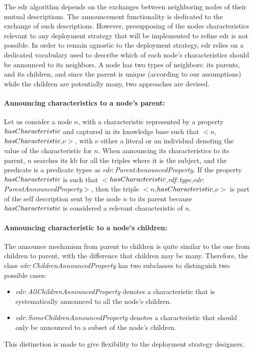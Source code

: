 \documentclass{iosart2c}
\newcommand{\namespace}[1]{\textit{#1$:$}}
\newcommand{\concept}[2]{\namespace{#1}\-\textit{#2}}
\newcommand{\triplet}[3]{$<$#1,\textit{#2},#3$>$}
\begin{document}
The \gls{edr} algorithm depends on the exchanges between neighboring nodes of their mutual descriptions.
The announcement functionality is dedicated to the exchange of such descriptions.
However, presupposing of the nodes characteristics relevant to any deployment strategy that will be implemented to refine \gls{edr} is not possible.
In order to remain agnostic to the deployment strategy, \gls{edr} relies on a dedicated vocabulary used to describe which of each node's characteristics should be announced to its neighbors. 
A node has two types of neighbors: its parents, and its children, and since the parent is unique (according to our assumptions) while the children are potentially many, two approaches are devised.

\paragraph{Announcing characteristics to a node's parent:}
Let us consider a node $n$, with a characteristic represented by a property $has\-Charac\-teris\-tic$ and captured in its knowledge base such that \triplet{$n$}{$has\-Charac\-teris\-tic$}{$\nu$}, with $\nu$ either a literal or an individual denoting the value of the characteristic for $n$.
When announcing its characteristics to its parent, $n$ searches its \gls{kb} for all the triples where it is the subject, and the predicate is a predicate types as \concept{edr}{Parent\-Announced\-Property}.
If the property $has\-Charac\-teris\-tic$ is such that \triplet{$has\-Charac\-teris\-tic$}{\concept{rdf}{type}}{\concept{edr}{Parent\-Announced\-Property}}, then the triple \triplet{$n$}{$has\-Charac\-teris\-tic$}{$\nu$} is part of the self description sent by the node $n$ to its parent because $has\-Charac\-teris\-tic$ is considered a relevant characteristic of $n$.

\paragraph{Announcing characteristic to a node's children:}
The announce mechanism from parent to children is quite similar to the one from children to parent, with the difference that children may be many.
Therefore, the class \concept{edr}{Children\-Announced\-Property} has two subclasses to distinguish two possible cases:
\begin{itemize}
	\item \concept{edr}{All\-Children\-Announced\-Property} denotes a characteristic that is systematically announced to all the node's children.
	\item \concept{edr}{Some\-Children\-Announced\-Property} denotes a characteristic that should only be announced to a subset of the node's children. 
\end{itemize}
This distinction is made to give flexibility to the deployment strategy designers.
\end{document}

